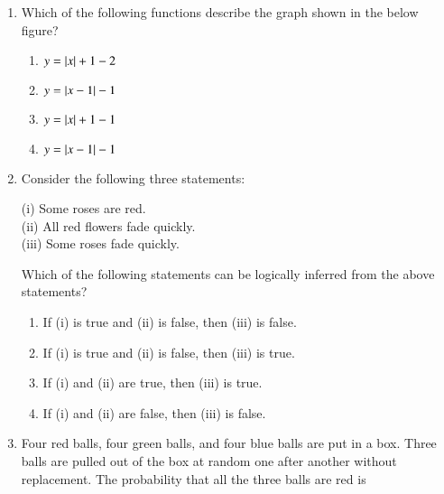\documentclass[journal,9pt,onecolumn]{IEEEtran}
\begin{document}
\begin{enumerate}
\begin{multicols}{4}
\begin{enumerate}
    \item 210 and 140
    \item 162.5 and 187.5
    \item 245 and 130
    \item 175 and 200
\end{enumerate}
\end{multicols}

    
\item Which of the following functions describe the graph shown in the below figure? \hfill {}
\begin{center}
    
\end{center}
\begin{multicols}{4}
\begin{enumerate}
    \item $y = \left\vert x\right\vert + 1 - 2$
    \item $y = \left\vert x - 1\right\vert - 1$
    \item $y = \left\vert x\right\vert + 1 - 1$
    \item $y = \left\vert x - 1\right\vert - 1$
\end{enumerate}
\end{multicols}

\item Consider the following three statements:

(i) Some roses are red. \\
(ii) All red flowers fade quickly. \\
(iii) Some roses fade quickly.

Which of the following statements can be logically inferred from the above statements?
\hfill {}
\begin{enumerate}
    \item If (i) is true and (ii) is false, then (iii) is false.
    \item If (i) is true and (ii) is false, then (iii) is true.
    \item If (i) and (ii) are true, then (iii) is true.
    \item If (i) and (ii) are false, then (iii) is false.
\end{enumerate}


\item Four red balls, four green balls, and four blue balls are put in a box. Three balls are pulled out of the box at random one after another without replacement. The probability that all the three balls are red is \hfill {}


\end{enumerate}
\end{document}
